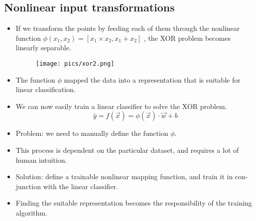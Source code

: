 \subsection{Nonlinear input transformations}
\begin{itemize}
\item If we transform the points by feeding each of them through the nonlinear function $\phi(x_1,x_2) = [x_1 \times x_2, x_1 + x_2 ]$ , the XOR problem becomes linearly separable.
\begin{figure}[htb]
	\centering
	 \texttt{[image: pics/xor2.png]}
\end{figure}
\item The function $\phi$ mapped the data into a representation that is suitable for linear classification.
\item We can now easily train a linear classifier to solve the XOR problem.
\begin{equation}
 \hat{y} = f(\vec{x}) = \phi(\vec{x}) \cdot \vec{w} +b
\end{equation}
\item Problem: we need to manually define the function $\phi$.
\item This process is dependent on the particular dataset, and requires a lot of human intuition.
\item Solution: define a trainable nonlinear mapping function, and train it in con-
junction with the linear classifier.
\item Finding the suitable representation becomes the responsibility of the training algorithm.
\end{itemize}


